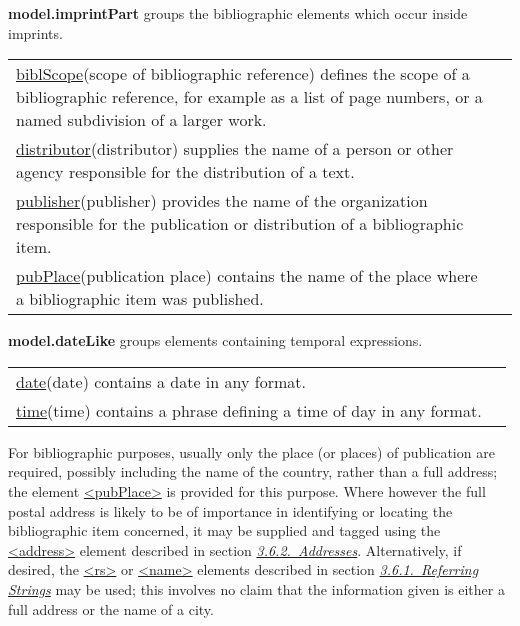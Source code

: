 \begin{sansreflist}
  
\item [\textbf{model.imprintPart}] groups the bibliographic elements which occur inside imprints. \par 
\begin{longtable}{P{0.19436392914653783\textwidth}P{0.6556360708534621\textwidth}}
\hyperref[TEI.biblScope]{biblScope}\tabcellsep (scope of bibliographic reference) defines the scope of a bibliographic reference, for example as a list of page numbers, or a named subdivision of a larger work.\\
\hyperref[TEI.distributor]{distributor}\tabcellsep (distributor) supplies the name of a person or other agency responsible for the distribution of a text.\\
\hyperref[TEI.publisher]{publisher}\tabcellsep (publisher) provides the name of the organization responsible for the publication or distribution of a bibliographic item.\\
\hyperref[TEI.pubPlace]{pubPlace}\tabcellsep (publication place) contains the name of the place where a bibliographic item was published.\end{longtable} \par
 
\item [\textbf{model.dateLike}] groups elements containing temporal expressions. \par 
\begin{longtable}{P{0.2852348993288591\textwidth}P{0.5647651006711409\textwidth}}
\hyperref[TEI.date]{date}\tabcellsep (date) contains a date in any format.\\
\hyperref[TEI.time]{time}\tabcellsep (time) contains a phrase defining a time of day in any format.\end{longtable} \par
 
\end{sansreflist}
\par
For bibliographic purposes, usually only the place (or places) of publication are required, possibly including the name of the country, rather than a full address; the element \hyperref[TEI.pubPlace]{<pubPlace>} is provided for this purpose. Where however the full postal address is likely to be of importance in identifying or locating the bibliographic item concerned, it may be supplied and tagged using the \hyperref[TEI.address]{<address>} element described in section \textit{\hyperref[CONAAD]{3.6.2.\ Addresses}}. Alternatively, if desired, the \hyperref[TEI.rs]{<rs>} or \hyperref[TEI.name]{<name>} elements described in section \textit{\hyperref[CONARS]{3.6.1.\ Referring Strings}} may be used; this involves no claim that the information given is either a full address or the name of a city.\par

